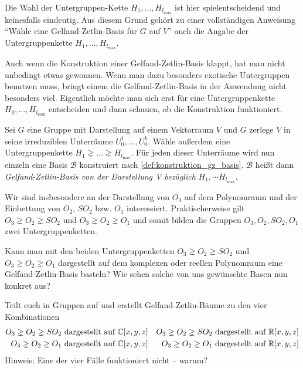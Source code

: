 \begin{remark}
		Die Wahl der Untergruppen-Kette $H_1,\ldots,H_{l_{\text{max}}}$ ist hier spielentscheidend und keinesfalls eindeutig. Aus diesem Grund gehört zu einer vollständigen Anweisung \enquote{Wähle eine Gelfand-Zetlin-Basis für $G$ auf $V$} auch die Angabe der Untergruppenkette $H_1,\ldots,H_{l_{\text{max}}}$.
\end{remark}
\begin{remark}
	Auch wenn die Konstruktion einer Gelfand-Zetlin-Basis klappt, hat man nicht unbedingt etwas gewonnen. Wenn man dazu besonders exotische Untergruppen benutzen muss, bringt einem die Gelfand-Zetlin-Basis in der Anwendung nicht besonders viel. Eigentlich möchte man sich erst für eine Untergruppenkette $H_0,\ldots,H_{l_{\text{max}}}$ entscheiden und dann schauen, ob die Konstruktion funktioniert.
\end{remark}
\begin{definition}[$\Gae\jae\el\soft\fae\aaa\en\dae$-$\Zae\jae\tae\el\iii\en$-$\Bae\aaa\sae\aaa$]
	\label{def:gz_basis}
	Sei $G$ eine Gruppe mit Darstellung auf einem Vektorraum $V$ und $G$ zerlege $V$ in seine irreduziblen Unterräume $U^1_0,\ldots,U^k_0$. Wähle außerdem eine Untergruppenkette $H_1 \gneq\ldots\gneq H_{l_{\text{max}}}$. Für jeden dieser Unterräume wird nun einzeln eine Basis $\mathcal{B}$ konstruiert nach \ref{def:konstruktion_gz_basis}. $\mathcal{B}$ heißt dann \emph{Gelfand-Zetlin-Basis von der Darstellung V bezüglich} $H_1,\cdots H_{l_{\text{max}}}$. 
\end{definition}

\begin{remark}
	Wir sind insbesondere an der Darstellung von $O_3$ auf dem Polynomraum und der Einbettung von $O_2$, $SO_2$ bzw. $O_1$ interessiert. Praktischerweise gilt $O_3\gneq O_2\gneq SO_2$ und  $O_3\gneq O_2\gneq O_1$ und somit bilden die Gruppen $O_3, O_2, SO_2, O_1$ zwei Untergruppenketten.
\end{remark}

\begin{centralquestion}[Fortsetzung]\label{cq:fortsetzung}
	Kann man mit den beiden Untergruppenketten $O_3\gneq O_2\gneq SO_2$ und  $O_3\gneq O_2\gneq O_1$ dargestellt auf dem komplexen oder reellen Polynomraum eine Gelfand-Zetlin-Basis basteln? Wie sehen solche von uns gewünschte Basen nun konkret aus?

	Teilt euch in Gruppen auf und erstellt Gelfand-Zetlin-Bäume zu den vier Kombinationen
	\begin{align*}
		O_3\gneq O_2\gneq SO_2 \text{ dargestellt auf }& \mathbb{C}[x,y,z] & O_3\gneq O_2\gneq SO_2 \text{ dargestellt auf }& \mathbb{R}[x,y,z] \\
		O_3\gneq O_2\gneq O_1 \text{ dargestellt auf }& \mathbb{C}[x,y,z] & O_3\gneq O_2\gneq O_1 \text{ dargestellt auf }& \mathbb{R}[x,y,z]
	\end{align*}
	Hinweis: Eine der vier Fälle funktioniert nicht -- warum?
\end{centralquestion}

